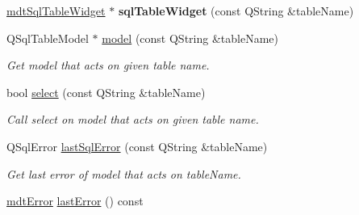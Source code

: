 \begin{DoxyCompactItemize}
\item 
\hypertarget{classmdt_sql_form_old_adc4eb9721bf1334f493d3423c89bb409}{
\hyperlink{classmdt_sql_table_widget}{mdtSqlTableWidget} $\ast$ {\bfseries sqlTableWidget} (const QString \&tableName)}
\label{classmdt_sql_form_old_adc4eb9721bf1334f493d3423c89bb409}

\item 
QSqlTableModel $\ast$ \hyperlink{classmdt_sql_form_old_a06590b7a39b01a781a1d60b038167955}{model} (const QString \&tableName)
\begin{DoxyCompactList}\small\item\em Get model that acts on given table name. \end{DoxyCompactList}\item 
bool \hyperlink{classmdt_sql_form_old_a9bf735ac7d14010815ce900cbb6d765e}{select} (const QString \&tableName)
\begin{DoxyCompactList}\small\item\em Call select on model that acts on given table name. \end{DoxyCompactList}\item 
QSqlError \hyperlink{classmdt_sql_form_old_aac606047522c36ed2b97b60a26032e0f}{lastSqlError} (const QString \&tableName)
\begin{DoxyCompactList}\small\item\em Get last error of model that acts on tableName. \end{DoxyCompactList}\item 
\hypertarget{classmdt_sql_form_old_a713fc54b324ff7a499489cbcb5289826}{
\hyperlink{classmdt_error}{mdtError} \hyperlink{classmdt_sql_form_old_a713fc54b324ff7a499489cbcb5289826}{lastError} () const }
\label{classmdt_sql_form_old_a713fc54b324ff7a499489cbcb5289826}


\end{DoxyCompactItemize}
